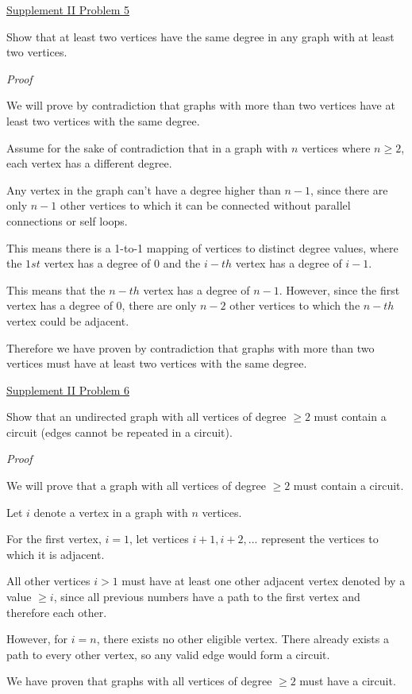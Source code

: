 \documentclass{article}
\begin{document}
\underline{Supplement II Problem 5}

Show that at least two vertices have the same degree in any graph with at least
two vertices.

\textit{Proof}

We will prove by contradiction that graphs with more than two vertices have at least two vertices with the same degree.

Assume for the sake of contradiction that in a graph with $n$ vertices where $n \geq 2$, each vertex has a different degree.

Any vertex in the graph can't have a degree higher than $n-1$, since there are only $n-1$ other vertices to which it can be connected without parallel connections or self loops.

This means there is a 1-to-1 mapping of vertices to distinct degree values, where the $1st$ vertex has a degree of $0$ and the $i-th$ vertex has a degree of $i-1$. 

This means that the $n-th$ vertex has a degree of $n-1$. However, since the first vertex has a degree of $0$, there are only $n-2$ other vertices to which the $n-th$ vertex could be adjacent.

Therefore we have proven by contradiction that graphs with more than two vertices must have at least two vertices with the same degree.\newline{}

\underline{Supplement II Problem 6}

Show that an undirected graph with all vertices of degree $\geq 2$ must contain a circuit (edges cannot be repeated in a circuit).

\textit{Proof}

We will prove that a graph with all vertices of degree $\geq 2$ must contain a circuit.

Let $i$ denote a vertex in a graph with $n$ vertices.

For the first vertex, $i=1$, let vertices $i+1, i+2, ...$ represent the vertices to which it is adjacent.

All other vertices $i>1$ must have at least one other adjacent vertex denoted by a value $\geq i$, since all previous numbers have a path to the first vertex and therefore each other.

However, for $i=n$, there exists no other eligible vertex. There already exists a path to every other vertex, so any valid edge would form a circuit.

We have proven that graphs with all vertices of degree $\geq 2$ must have a circuit.
\end{document}
